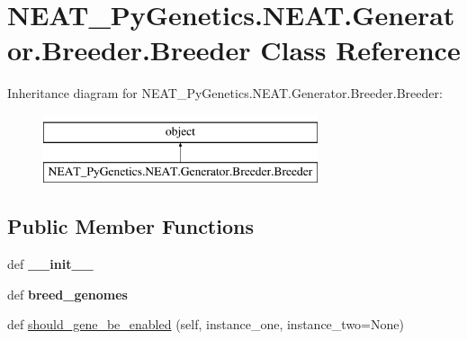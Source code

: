 \hypertarget{class_n_e_a_t___py_genetics_1_1_n_e_a_t_1_1_generator_1_1_breeder_1_1_breeder}{}\section{N\+E\+A\+T\+\_\+\+Py\+Genetics.\+N\+E\+A\+T.\+Generator.\+Breeder.\+Breeder Class Reference}
\label{class_n_e_a_t___py_genetics_1_1_n_e_a_t_1_1_generator_1_1_breeder_1_1_breeder}
Inheritance diagram for N\+E\+A\+T\+\_\+\+Py\+Genetics.\+N\+E\+A\+T.\+Generator.\+Breeder.\+Breeder\+:\begin{figure}[H]
\begin{center}
\leavevmode
\includegraphics[height=2.000000cm]{class_n_e_a_t___py_genetics_1_1_n_e_a_t_1_1_generator_1_1_breeder_1_1_breeder}
\end{center}
\end{figure}
\subsection*{Public Member Functions}
\begin{DoxyCompactItemize}
\item 
def {\bfseries \+\_\+\+\_\+init\+\_\+\+\_\+}\hypertarget{class_n_e_a_t___py_genetics_1_1_n_e_a_t_1_1_generator_1_1_breeder_1_1_breeder_a99ffddd6afb3f995598605e165772515}{}\label{class_n_e_a_t___py_genetics_1_1_n_e_a_t_1_1_generator_1_1_breeder_1_1_breeder_a99ffddd6afb3f995598605e165772515}

\item 
def {\bfseries breed\+\_\+genomes}\hypertarget{class_n_e_a_t___py_genetics_1_1_n_e_a_t_1_1_generator_1_1_breeder_1_1_breeder_a6e78ccec465831c858910b1319e75076}{}\label{class_n_e_a_t___py_genetics_1_1_n_e_a_t_1_1_generator_1_1_breeder_1_1_breeder_a6e78ccec465831c858910b1319e75076}

\item 
def \hyperlink{class_n_e_a_t___py_genetics_1_1_n_e_a_t_1_1_generator_1_1_breeder_1_1_breeder_a761995541d6d9ff88e2ee112a57dff0f}{should\+\_\+gene\+\_\+be\+\_\+enabled} (self, instance\+\_\+one, instance\+\_\+two=None)
\end{DoxyCompactItemize}
